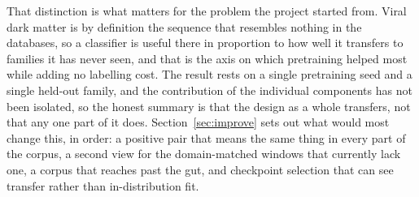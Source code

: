 \documentclass[10pt,twocolumn,a4paper]{article}
\begin{document}
That distinction is what matters for the problem the project started from. Viral
dark matter is by definition the sequence that resembles nothing in the
databases, so a classifier is useful there in proportion to how well it transfers
to families it has never seen, and that is the axis on which pretraining helped
most while adding no labelling cost. The result rests on a single pretraining
seed and a single held-out family, and the contribution of the individual
components has not been isolated, so the honest summary is that the design as a
whole transfers, not that any one part of it does.
Section~\ref{sec:improve} sets out what would most change this, in order: a
positive pair that means the same thing in every part of the corpus, a second
view for the domain-matched windows that currently lack one, a corpus that
reaches past the gut, and checkpoint selection that can see transfer rather than
in-distribution fit.

{\scriptsize


}
\end{document}
